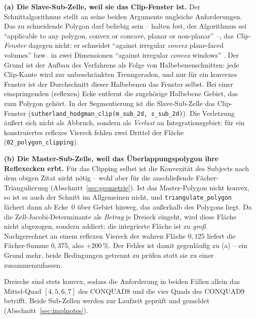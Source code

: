 \documentclass[a4paper,11pt]{article}
\newcommand{\code}[1]{\texttt{\small #1}}
\newcommand{\file}[1]{\texttt{\small #1}}
\begin{document}
\medskip
\noindent\textbf{(a) Die Slave-Sub-Zelle, weil sie das Clip-Fenster ist.} Der Schnittalgorithmus
stellt an seine beiden Argumente ungleiche Anforderungen. Das zu schneidende Polygon darf beliebig
sein -- \citet[S.~33]{sutherland1974} halten fest, der Algorithmus sei ``applicable to any polygon,
convex or concave, planar or non-planar'' --, das \emph{Clip-Fenster} dagegen nicht: er schneidet
``against irregular \emph{convex} plane-faced volumes'' bzw.\ in zwei Dimensionen ``against
irregular \emph{convex} windows'' \citep[S.~32]{sutherland1974}. Der Grund ist der Aufbau des
Verfahrens als Folge von Halbebenenschnitten: jede Clip-Kante wird zur unbeschränkten
Trenngeraden, und nur für ein konvexes Fenster ist der Durchschnitt dieser Halbebenen das Fenster
selbst. Bei einer einspringenden (reflexen) Ecke entfernt die zugehörige Halbebene Gebiet, das zum
Polygon gehört. In der Segmentierung ist die Slave-Sub-Zelle das Clip-Fenster
(\code{sutherland\_hodgman\_clip(m\_sub\_2d, s\_sub\_2d)}). Die Verletzung äußert sich nicht als
Abbruch, sondern als \emph{Verlust} an Integrationsgebiet: für ein konstruiertes reflexes Viereck
fehlen zwei Drittel der Fläche (\file{02\_polygon\_clipping}).

\medskip
\noindent\textbf{(b) Die Master-Sub-Zelle, weil das Überlappungspolygon ihre Reflexecken erbt.}
Für das Clipping selbst ist die Konvexität des Subjects nach dem obigen Zitat nicht nötig -- wohl
aber für die anschließende Fächer-Triangulierung (Abschnitt~\ref{sec:geometrie}). Ist das
Master-Polygon nicht konvex, so ist es auch der Schnitt im Allgemeinen nicht, und
\code{triangulate\_polygon} fächert dann ab Ecke~0 über Gebiet hinweg, das außerhalb des Polygons
liegt. Da die Zell-Jacobi-Determinante als \emph{Betrag} je Dreieck eingeht, wird diese Fläche
nicht abgezogen, sondern addiert: die integrierte Fläche ist zu \emph{groß}. Nachgerechnet an
einem reflexen Viereck der wahren Fläche $0{,}125$ liefert die Fächer-Summe $0{,}375$, also
$+200\,\%$. Der Fehler ist damit gegenläufig zu (a) -- ein Grund mehr, beide Bedingungen getrennt
zu prüfen statt sie zu einer zusammenzufassen.

\medskip
\noindent Dreiecke sind stets konvex, sodass die Anforderung in beiden Fällen allein das
Mittel-Quad $[4,5,6,7]$ des CONQUAD8 und die vier Quads des CONQUAD9 betrifft. Beide Sub-Zellen
werden zur Laufzeit geprüft und gemeldet (Abschnitt~\ref{sec:implnotes}).
\end{document}

